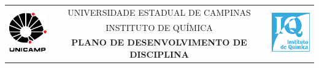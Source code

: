 \documentclass[11pt,a4paper,ssfamily]{exam}                                        %
\begin{document}
\sffamily                                                                          %
\pagestyle{empty}                                                                  %
\begin{center}                                                                     %
\begin{tabularx}{\textwidth}{cCc}                                                  %
        &  UNIVERSIDADE ESTADUAL DE CAMPINAS   &                                   %
 \\              %
        &         INSTITUTO DE QUÍMICA         &     \\                            %
       & \textbf{PLANO DE DESENVOLVIMENTO DE DISCIPLINA} \\                        %
\end{tabularx}                                                                     %
\vspace{0.5cm}                                                                     %
\end{center}                                                                       %
\end{document}
